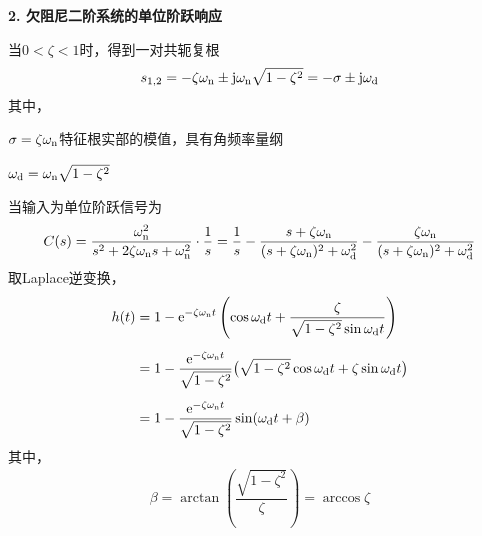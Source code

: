 \noindent \textbf{2. 欠阻尼二阶系统的单位阶跃响应}
\par 当$0< \zeta <1$时，得到一对共轭复根
\begin{align}
	s_{1,2} = - \zeta \omega_{\rm{n}} \pm \text{j} \omega_{\rm{n}} \sqrt{1 - \zeta^2} = - \sigma \pm \text{j} \omega_\text{d}
\end{align}
其中，
\begin{myitemize}
	\item $\sigma = \zeta \omega_{\rm{n}}$\quad 特征根实部的模值，具有角频率量纲\vspace*{-0.5em}
	\item $\omega_\text{d} = \omega_{\rm{n}}\sqrt{1 - \zeta^2}$ \quad {}\vspace*{0.3em}
\end{myitemize}
当输入为单位阶跃信号为
\begin{align*}
	C(s) = \dfrac{\omega_{\rm{n}}^2}{s^2 + 2 \zeta \omega_{\rm{n}} s + \omega_{\rm{n}}^2} \cdot \dfrac{1}{s} = \dfrac{1}{s} - \dfrac{s + \zeta \omega_{\rm{n}}}{(s+ \zeta \omega_{\rm{n}})^2 + \omega_\text{d}^2} -\dfrac{\zeta \omega_{\rm{n}}}{(s+ \zeta \omega_{\rm{n}})^2 + \omega_\text{d}^2} 
\end{align*}
取Laplace逆变换，
\begin{align}
	h(t) &= 1 - {\rm{e}}^{- \zeta \omega_{\rm{n}} t}\left(\cos \omega_\text{d} t + \dfrac{\zeta}{\sqrt{1 - \zeta^2}\sin \omega_\text{d} t}\right)\notag\\[0.5em]
	& =1 - \dfrac{{\rm{e}}^{-\zeta \omega_{\rm{n}} t} }{\sqrt{1 - \zeta^2}}\big(\sqrt{1 - \zeta^2}\cos \omega_\text{d}t + \zeta \sin \omega_\text{d}t\big)\\[0.5em]
	& = 1 - \dfrac{{\rm{e}}^{-\zeta \omega_{\rm{n}} t}}{\sqrt{1 - \zeta^2}}\sin (\omega_\text{d}t + \beta)
	\label{欠阻尼二阶公式}
\end{align}
其中，
\begin{align}
	\beta = \arctan\left(\dfrac{\sqrt{1 - \zeta^2}}{\zeta}\right) = \arccos\zeta
\end{align}

